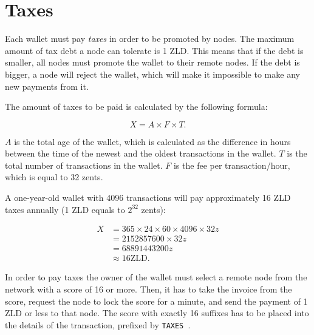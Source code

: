 \documentclass[11pt,oneside]{article}
\newcommand\dd[1]{\colorbox{gray!30}{\texttt{#1}}}
\begin{document}
\section{Taxes}\label{sec:taxes}

Each wallet must pay \emph{taxes} in order to be promoted by nodes.
The maximum amount of tax debt a node can tolerate is 1 ZLD. This means
that if the debt is smaller, all nodes must promote the wallet to their
remote nodes. If the debt is bigger, a node will reject the wallet,
which will make it impossible to make any new payments from it.

The amount of taxes to be paid is calculated by the following formula:

\begin{equation}
X = A \times F \times T.
\end{equation}

$A$ is the total age of the wallet,
which is calculated as the difference in hours between the time of the newest and
the oldest transactions in the wallet.
$T$ is the total number of transactions in the wallet.
$F$ is the fee per transaction/hour, which is equal to 32 zents.

A one-year-old wallet with 4096 transactions will pay approximately 16 ZLD taxes annually
(1 ZLD equals to $2^{32}$ zents):

\begin{equation}
\begin{split}
X & = 365 \times 24 \times 60 \times 4096 \times 32z \\
  & = \num{2152857600} \times 32z \\
  & = \num{68891443200}z \\
  & \approx 16 \text{ZLD}.
\end{split}
\end{equation}

In order to pay taxes the owner of the wallet must select a remote
node from the network with a score of 16 or more. Then, it has to
take the invoice from the score, request the node to lock the score
for a minute, and send the payment of 1 ZLD or less
to that node. The score with exactly 16 suffixes
has to be placed into the details of the transaction,
prefixed by \dd{TAXES }.
\end{document}
